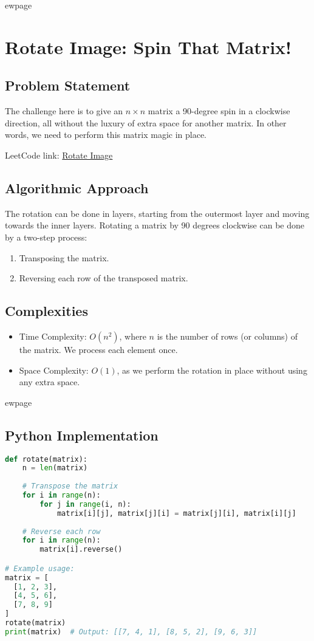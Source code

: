 
ewpage
\chapter{Rotate Image: Spin That Matrix!}
\label{chap:rotate_image}

\section*{Problem Statement}
The challenge here is to give an \( n \times n \) matrix a 90-degree spin in a clockwise direction, all without the luxury of extra space for another matrix. In other words, we need to perform this matrix magic in place.

LeetCode link: \href{https://leetcode.com/problems/rotate-image/}{Rotate Image}

\section*{Algorithmic Approach}
The rotation can be done in layers, starting from the outermost layer and moving towards the inner layers. Rotating a matrix by 90 degrees clockwise can be done by a two-step process:
\begin{enumerate}
  \item Transposing the matrix.
  \item Reversing each row of the transposed matrix.
\end{enumerate}

\section*{Complexities}
\begin{itemize}
    \item Time Complexity: $O(n^2)$, where $n$ is the number of rows (or columns) of the matrix. We process each element once.
    \item Space Complexity: $O(1)$, as we perform the rotation in place without using any extra space.
\end{itemize}


ewpage

\section*{Python Implementation}

\begin{fullwidth}
\begin{lstlisting}[language=Python]
def rotate(matrix):
    n = len(matrix)
    
    # Transpose the matrix
    for i in range(n):
        for j in range(i, n):
            matrix[i][j], matrix[j][i] = matrix[j][i], matrix[i][j]
    
    # Reverse each row
    for i in range(n):
        matrix[i].reverse()

# Example usage:
matrix = [
  [1, 2, 3],
  [4, 5, 6],
  [7, 8, 9]
]
rotate(matrix)
print(matrix)  # Output: [[7, 4, 1], [8, 5, 2], [9, 6, 3]]
\end{lstlisting}

\end{fullwidth}

